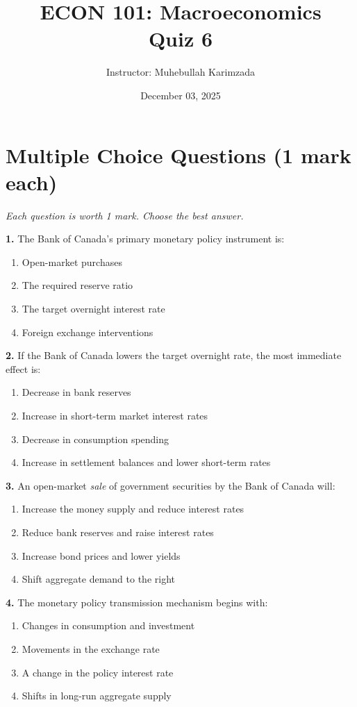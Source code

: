 \documentclass[12pt]{article}
\title{ECON 101: Macroeconomics \vspace{5pt}\\ Quiz 6}
\author{Instructor: Muhebullah Karimzada}
\date{December 03,  2025}
\begin{document}
\maketitle

\section*{Multiple Choice Questions (1 mark each)}
\textit{Each question is worth 1 mark. Choose the best answer.}


\textbf{1.} The Bank of Canada's primary monetary policy instrument is:
\begin{enumerate}[label=(\Alph*)]
    \item Open-market purchases
    \item The required reserve ratio
    \item The target overnight interest rate
    \item Foreign exchange interventions
\end{enumerate}

\textbf{2.} If the Bank of Canada lowers the target overnight rate, the most immediate effect is:
\begin{enumerate}[label=(\Alph*)]
    \item Decrease in bank reserves
    \item Increase in short-term market interest rates
    \item Decrease in consumption spending
    \item Increase in settlement balances and lower short-term rates
\end{enumerate}

\textbf{3.} An open-market \emph{sale} of government securities by the Bank of Canada will:
\begin{enumerate}[label=(\Alph*)]
    \item Increase the money supply and reduce interest rates
    \item Reduce bank reserves and raise interest rates
    \item Increase bond prices and lower yields
    \item Shift aggregate demand to the right
\end{enumerate}

\textbf{4.} The monetary policy transmission mechanism begins with:
\begin{enumerate}[label=(\Alph*)]
    \item Changes in consumption and investment
    \item Movements in the exchange rate
    \item A change in the policy interest rate
    \item Shifts in long-run aggregate supply
\end{enumerate}
\end{document}
